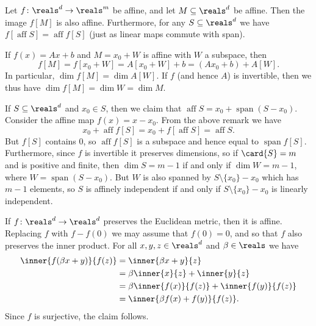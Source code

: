 \documentclass[article, a4paper, 11pt, oneside]{memoir}
\numberwithin{equation}{chapter}
\DeclareMathOperator{\Span}{span}
\theoremstyle{nonumberplain}
\newcommand{\aff}{\operatorname{aff}}
\begin{document}
\begin{remark}
    Let $f \colon \reals^d \to \reals^m$ be affine, and let $M \subseteq \reals^d$ be affine. Then the image $f[M]$ is also affine. Furthermore, for any $S \subseteq \reals^d$ we have $f[\aff S] = \aff f[S]$ (just as linear maps commute with span).

    If $f(x) = Ax + b$ and $M = x_0 + W$ is affine with $W$ a subspace, then
    \begin{equation*}
        f[M]
            = f[x_0 + W]
            = A[x_0 + W] + b
            = (Ax_0 + b) + A[W].
    \end{equation*}
    In particular, $\dim f[M] = \dim A[W]$. If $f$ (and hence $A$) is invertible, then we thus have $\dim f[M] = \dim W = \dim M$.
\end{remark}


\begin{remark}
    If $S \subseteq \reals^d$ and $x_0 \in S$, then we claim that $\aff S = x_0 + \Span(S - x_0)$. Consider the affine map $f(x) = x - x_0$. From the above remark we have
    \begin{equation*}
        x_0 + \aff f[S]
            = x_0 + f[\aff S]
            = \aff S.
    \end{equation*}
    But $f[S]$ contains $0$, so $\aff f[S]$ is a subspace and hence equal to $\Span f[S]$. Furthermore, since $f$ is invertible it preserves dimensions, so if $\card{S} = m$ and is positive and finite, then $\dim S = m-1$ if and only if $\dim W = m-1$, where $W = \Span(S - x_0)$. But $W$ is also spanned by $S \setminus \{x_0\} - x_0$ which has $m-1$ elements, so $S$ is affinely independent if and only if $S \setminus \{x_0\} - x_0$ is linearly independent.
\end{remark}


\begin{remark}
    If $f \colon \reals^d \to \reals^d$ preserves the Euclidean metric, then it is affine. Replacing $f$ with $f - f(0)$ we may assume that $f(0) = 0$, and so that $f$ also preserves the inner product. For all $x,y,z \in \reals^d$ and $\beta \in \reals$ we have
    \begin{align*}
        \inner{f(\beta x + y)}{f(z)}
            &= \inner{\beta x + y}{z} \\
            &= \beta \inner{x}{z} + \inner{y}{z} \\
            &= \beta \inner{f(x)}{f(z)} + \inner{f(y)}{f(z)} \\
            &= \inner{\beta f(x) + f(y)}{f(z)}.
    \end{align*}
    Since $f$ is surjective, the claim follows.
\end{remark}
\end{document}
